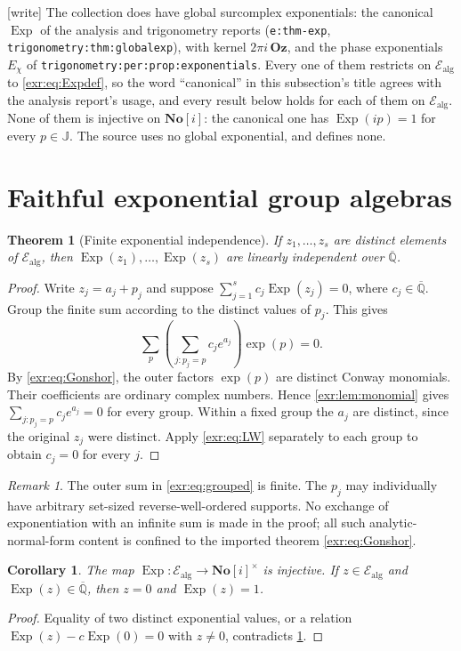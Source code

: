 \documentclass[11pt,letterpaper]{article}
\numberwithin{equation}{section}
\newtheorem{theorem}{Theorem}[section]
\newtheorem{corollary}[corollary]{Corollary}
\theoremstyle{definition}
\theoremstyle{remark}
\newtheorem{remark}[remark]{Remark}
\newcommand{\Oz}{\mathbf{Oz}}
\newcommand{\SC}{\mathbf{No}[i]}
\newcommand{\Qb}{\overline{\mathbb Q}}
\newcommand{\J}{\mathbb J}
\newcommand{\Ealg}{\mathcal E_{\mathrm{alg}}}
\newcommand{\Exp}{\operatorname{Exp}}
\newcommand{\lbl}[1]{\nolinkurl{#1}}%
\newcommand{\wtag}{\textup{[write]}}%
\begin{document}
\wtag{} The collection does have global surcomplex exponentials: the
canonical $\Exp$ of the analysis and trigonometry reports
(\lbl{e:thm-exp}, \lbl{trigonometry:thm:globalexp}), with kernel
$2\pi i\,\Oz$, and the phase exponentials $E_\chi$ of
\lbl{trigonometry:per:prop:exponentials}. Every one of them restricts on
$\Ealg$ to \eqref{exr:eq:Expdef}, so the word ``canonical'' in this
subsection's title agrees with the analysis report's usage, and every result
below holds for each of them on $\Ealg$. None of them is injective on
$\SC$: the canonical one has $\Exp(ip)=1$ for every $p\in\J$. The source
uses no global exponential, and defines none.

\section{Faithful exponential group algebras}\label{exr:sec:faithful}
\begin{theorem}[Finite exponential independence]\label{exr:thm:independence}
If $z_1,\ldots,z_s$ are distinct elements of $\Ealg$, then
$\Exp(z_1),\ldots,\Exp(z_s)$ are linearly independent over $\Qb$.
\end{theorem}
\begin{proof}
Write $z_j=a_j+p_j$ and suppose
$\sum_{j=1}^s c_j\Exp(z_j)=0$, where $c_j\in\Qb$. Group the finite sum according to
the distinct values of $p_j$. This gives
\begin{equation}\label{exr:eq:grouped}
 \sum_{p}\left(\sum_{j:p_j=p}c_j e^{a_j}\right)\exp(p)=0.
\end{equation}
By \eqref{exr:eq:Gonshor}, the outer factors $\exp(p)$ are distinct Conway monomials.
Their coefficients are ordinary complex numbers. Hence \cref{exr:lem:monomial} gives
$\sum_{j:p_j=p}c_j e^{a_j}=0$ for every group. Within a fixed group the $a_j$ are
distinct, since the original $z_j$ were distinct. Apply \eqref{exr:eq:LW} separately
to each group to obtain $c_j=0$ for every $j$.
\end{proof}

\begin{remark}
The outer sum in \eqref{exr:eq:grouped} is finite. The $p_j$ may individually have
arbitrary set-sized reverse-well-ordered supports. No exchange of exponentiation
with an infinite sum is made in the proof; all such analytic-normal-form content
is confined to the imported theorem \eqref{exr:eq:Gonshor}.
\end{remark}

\begin{corollary}\label{exr:cor:injective}
The map $\Exp:\Ealg\to\SC^\times$ is injective. If $z\in\Ealg$ and
$\Exp(z)\in\Qb$, then $z=0$ and $\Exp(z)=1$.
\end{corollary}
\begin{proof}
Equality of two distinct exponential values, or a relation
$\Exp(z)-c\Exp(0)=0$ with $z\ne0$, contradicts \cref{exr:thm:independence}.
\end{proof}
\end{document}
